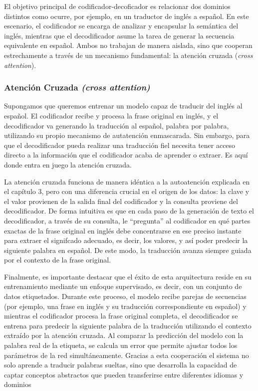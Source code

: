 El objetivo principal de codificador-decoficador es relacionar dos dominios distintos como ocurre, por ejemplo, en un traductor de inglés a español. En este escenario, el codificador se encarga de analizar y encapsular la semántica del inglés, mientras que el decodificador asume la tarea de generar la secuencia equivalente en español. Ambos no trabajan de manera aislada, sino que cooperan estrechamente a través de un mecanismo fundamental: la atención cruzada (\textit{cross attention}).


\subsubsection{Atención Cruzada \textit{(cross attention)}}
Supongamos que queremos entrenar un modelo capaz de traducir del inglés al español.
El codificador recibe y procesa la frase original en inglés, y el decodificador va generando la traducción al español, palabra por palabra, utilizando su propio mecanismo de autatención enmascarada. Sin embargo, para que el decodificador pueda realizar una traducción fiel necesita tener acceso directo a la información que el codificador acaba de aprender o extraer. Es aquí donde entra en juego la atención cruzada.

La atención cruzada funciona de manera idéntica a la autoatención explicada en el capítulo 3, pero con una diferencia crucial en el origen de los datos: la clave y el valor provienen de la salida final del codificador y la consulta proviene del decodificador. De forma intuitiva es que en cada paso de la generación de texto el decodificador, a través de su consulta, le ``pregunta'' al codificador en qué partes exactas de la frase original en inglés debe concentrarse en ese preciso instante para extraer el signifcado adecuado, es decir, los valores, y así poder predecir la siguiente palabra en español. De este modo, la traducción avanza siempre guiada por el contexto de la frase original.


Finalmente, es importante destacar que el éxito de esta arquitectura reside en su entrenamiento  mediante un enfoque supervisado, es decir, con un conjunto de datos etiquetados. Durante este proceso, el modelo recibe parejas de secuencias (por ejemplo, una frase en inglés y su traducción correspondiente en español) y mientras el codificador procesa la frase original completa, el decodificador se entrena para predecir la siguiente palabra de la traducción utilizando el contexto extraído por la atención cruzada. Al comparar la predicción del modelo con la palabra real de la etiqueta, se calcula un error que permite ajustar todos los parámetros de la red simultáneamente. Gracias a esta cooperación el sistema no solo aprende a traducir palabras sueltas, sino que desarrolla la capacidad de captar conceptos abstractos que pueden transferirse entre diferentes idiomas y dominios

